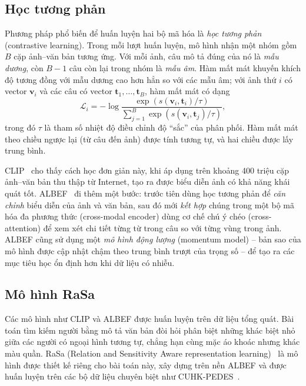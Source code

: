 \subsection{Học tương phản}
\label{sec:3.5.2}

Phương pháp phổ biến để huấn luyện hai bộ mã hóa là \emph{học tương phản} (contrastive learning). Trong mỗi lượt huấn luyện, mô hình nhận một nhóm gồm $B$ cặp ảnh--văn bản tương ứng. Với mỗi ảnh, câu mô tả đúng của nó là \emph{mẫu dương}, còn $B-1$ câu còn lại trong nhóm là \emph{mẫu âm}. Hàm mất mát khuyến khích độ tương đồng với mẫu dương cao hơn hẳn so với các mẫu âm; với ảnh thứ $i$ có vector $\mathbf{v}_i$ và các câu có vector $\mathbf{t}_1, \ldots, \mathbf{t}_B$, hàm mất mát có dạng
\begin{equation}
    \mathcal{L}_i = -\log \frac{\exp\left(s(\mathbf{v}_i, \mathbf{t}_i)/\tau\right)}{\sum_{j=1}^{B} \exp\left(s(\mathbf{v}_i, \mathbf{t}_j)/\tau\right)},
    \label{eq:contrastive}
\end{equation}
trong đó $\tau$ là tham số nhiệt độ điều chỉnh độ ``sắc'' của phân phối. Hàm mất mát theo chiều ngược lại (từ câu đến ảnh) được tính tương tự, và hai chiều được lấy trung bình.

CLIP~\cite{radford2021clip} cho thấy cách học đơn giản này, khi áp dụng trên khoảng 400 triệu cặp ảnh--văn bản thu thập từ Internet, tạo ra được biểu diễn ảnh có khả năng khái quát tốt. ALBEF~\cite{li2021albef} đi thêm một bước: trước tiên dùng học tương phản để \emph{căn chỉnh} biểu diễn của ảnh và văn bản, sau đó mới \emph{kết hợp} chúng trong một bộ mã hóa đa phương thức (cross-modal encoder) dùng cơ chế chú ý chéo (cross-attention) để xem xét chi tiết từng từ trong câu so với từng vùng trong ảnh. ALBEF cũng sử dụng một \emph{mô hình động lượng} (momentum model) -- bản sao của mô hình được cập nhật chậm theo trung bình trượt của trọng số -- để tạo ra các mục tiêu học ổn định hơn khi dữ liệu có nhiễu.

\subsection{Mô hình RaSa}
\label{sec:3.5.3}

Các mô hình như CLIP và ALBEF được huấn luyện trên dữ liệu tổng quát. Bài toán tìm kiếm người bằng mô tả văn bản đòi hỏi phân biệt những khác biệt nhỏ giữa các người có ngoại hình tương tự, chẳng hạn cùng mặc áo khoác nhưng khác màu quần. RaSa (Relation and Sensitivity Aware representation learning)~\cite{bai2023rasa} là mô hình được thiết kế riêng cho bài toán này, xây dựng trên nền ALBEF và được huấn luyện trên các bộ dữ liệu chuyên biệt như CUHK-PEDES~\cite{li2017cuhkpedes}.

